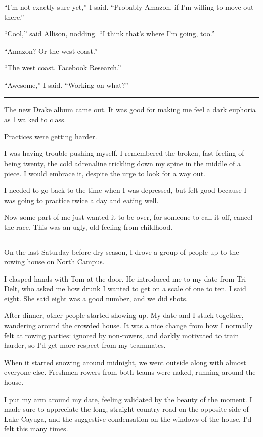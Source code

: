 ``I'm not exactly sure yet,'' I said.  ``Probably Amazon, if I'm willing to move
out there.''

``Cool,'' said Allison, nodding.  ``I think that's where I'm going, too.''

``Amazon?  Or the west coast.''

``The west coast.  Facebook Research.''

``Awesome,'' I said.  ``Working on what?''

\plainfancybreak{12pt}{2}{}

The new Drake album came out.  It was good for making me feel a dark euphoria
as I walked to class.

Practices were getting harder.

I was having trouble pushing myself.  I remembered the broken, fast feeling of
being twenty, the cold adrenaline trickling down my spine in the middle of a
piece.  I would embrace it, despite the urge to look for a way out.

I needed to go back to the time when I was depressed, but felt good because I
was going to practice twice a day and eating well.

Now some part of me just wanted it to be over, for someone to call it off,
cancel the race.  This was an ugly, old feeling from childhood.

\plainfancybreak{12pt}{2}{}

On the last Saturday before dry season, I drove a group of people up to the
rowing house on North Campus.

I clasped hands with Tom at the door.  He introduced me to my date from
Tri-Delt, who asked me how drunk I wanted to get on a scale of one to ten. I
said eight.  She said eight was a good number, and we did shots.

After dinner, other people started showing up.  My date and I stuck together,
wandering around the crowded house.  It was a nice change from how I normally
felt at rowing parties: ignored by non-rowers, and darkly motivated to train
harder, so I'd get more respect from my teammates.

When it started snowing around midnight, we went outside along with almost
everyone else.  Freshmen rowers from both teams were naked, running around the
house.

I put my arm around my date, feeling validated by the beauty of the moment.  I
made sure to appreciate the long, straight country road on the opposite side of
Lake Cayuga, and the suggestive condensation on the windows of the house.  I'd
felt this many times.

